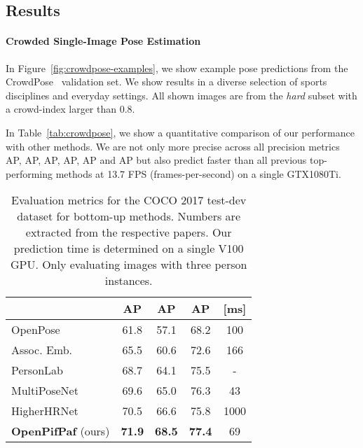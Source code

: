 \documentclass[journal]{IEEEtran}
\newcommand{\hl}[1]{#1}
\begin{document}
\subsection{Results}

\paragraph{Crowded Single-Image Pose Estimation}
In Figure~\ref{fig:crowdpose-examples}, we show example pose predictions from
the CrowdPose~\cite{li2019crowdpose} validation set. We show results
in a diverse selection of sports disciplines and everyday settings. All shown
images are from the \emph{hard} subset with a crowd-index larger than 0.8.

In Table~\ref{tab:crowdpose}, we show a quantitative comparison of our
performance with other methods. We are not only more precise across all
precision metrics AP, AP, AP, AP,
AP and AP but also predict faster than all
previous top-performing methods at 13.7 FPS (frames-per-second)
on a single GTX1080Ti.





\begin{table}[t]
  \centering
  \caption{
    Evaluation metrics for the COCO 2017 test-dev dataset for
    bottom-up methods. Numbers are extracted from the respective papers.
    Our prediction time is determined on a single V100 GPU.
    Only evaluating images with three person instances.
  }
  \label{tab:high-res}
  \begin{tabular}{|l|c c c c|}
    \hline
                            & \textbf{AP} & AP & AP &  [ms] \\
    \hline\hline
    OpenPose~\cite{cao2017realtime}                 & 61.8 & 57.1 & 68.2 & 100 \\
    Assoc. Emb.~\cite{newell2017associative}  & 65.5 & 60.6 & 72.6 & 166 \\
PersonLab~\cite{papandreou2018personlab}     & 68.7 & 64.1 & 75.5 & - \\
    MultiPoseNet~\cite{kocabas2018multiposenet}  & 69.6 & 65.0 & 76.3 & 43 \\
    HigherHRNet~\cite{cheng2020higherhrnet}           & 70.5 & 66.6 & 75.8 & 1000 \\
    \textbf{OpenPifPaf} (ours)  & \textbf{\hl{71.9}} & \textbf{\hl{68.5}} & \textbf{\hl{77.4}} & \hl{69} \\
    \hline
  \end{tabular}
\end{table}
\end{document}
